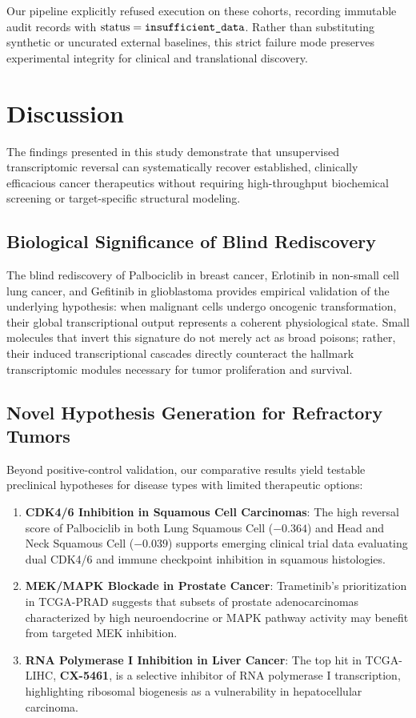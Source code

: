 \documentclass[10pt,journal,compsoc,twocolumn]{IEEEtran}
\begin{document}
Our pipeline explicitly refused execution on these cohorts, recording immutable audit records with $\text{status} = \text{\texttt{insufficient\_data}}$. Rather than substituting synthetic or uncurated external baselines, this strict failure mode preserves experimental integrity for clinical and translational discovery.

\section{Discussion}
The findings presented in this study demonstrate that unsupervised transcriptomic reversal can systematically recover established, clinically efficacious cancer therapeutics without requiring high-throughput biochemical screening or target-specific structural modeling. 

\subsection{Biological Significance of Blind Rediscovery}
The blind rediscovery of Palbociclib in breast cancer, Erlotinib in non-small cell lung cancer, and Gefitinib in glioblastoma provides empirical validation of the underlying hypothesis: when malignant cells undergo oncogenic transformation, their global transcriptional output represents a coherent physiological state. Small molecules that invert this signature do not merely act as broad poisons; rather, their induced transcriptional cascades directly counteract the hallmark transcriptomic modules necessary for tumor proliferation and survival.

\subsection{Novel Hypothesis Generation for Refractory Tumors}
Beyond positive-control validation, our comparative results yield testable preclinical hypotheses for disease types with limited therapeutic options:
\begin{enumerate}
    \item \textbf{CDK4/6 Inhibition in Squamous Cell Carcinomas}: The high reversal score of Palbociclib in both Lung Squamous Cell ($-0.364$) and Head and Neck Squamous Cell ($-0.039$) supports emerging clinical trial data evaluating dual CDK4/6 and immune checkpoint inhibition in squamous histologies.
    \item \textbf{MEK/MAPK Blockade in Prostate Cancer}: Trametinib's prioritization in TCGA-PRAD suggests that subsets of prostate adenocarcinomas characterized by high neuroendocrine or MAPK pathway activity may benefit from targeted MEK inhibition.
    \item \textbf{RNA Polymerase I Inhibition in Liver Cancer}: The top hit in TCGA-LIHC, \textbf{CX-5461}, is a selective inhibitor of RNA polymerase I transcription, highlighting ribosomal biogenesis as a vulnerability in hepatocellular carcinoma.
\end{enumerate}
\end{document}

